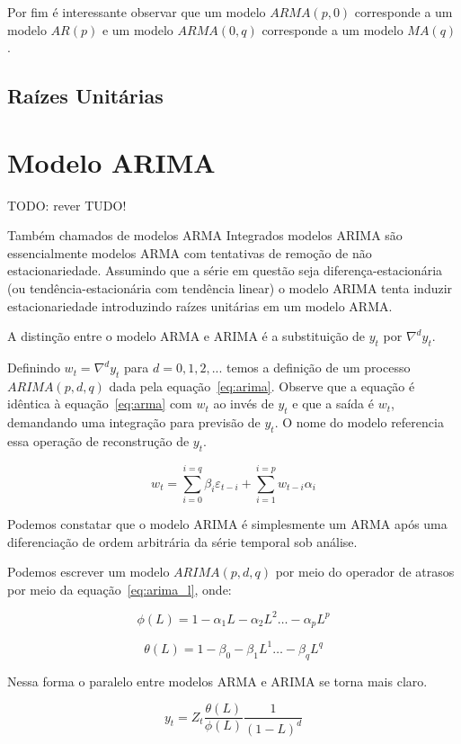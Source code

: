 Por fim é interessante observar que um modelo $ARMA(p, 0)$ corresponde
a um modelo $AR(p)$ e um modelo $ARMA(0, q)$ corresponde a um modelo
$MA(q)$.

\subsection{Raízes Unitárias}
\label{sec:unit_roots}

\section{Modelo ARIMA}
\label{sec:ARIMA}

TODO: rever TUDO!

Também chamados de modelos ARMA Integrados modelos ARIMA são essencialmente
modelos ARMA com tentativas de remoção de não estacionariedade. Assumindo que
a série em questão seja diferença-estacionária (ou tendência-estacionária
com tendência linear) o modelo ARIMA tenta induzir estacionariedade
introduzindo raízes unitárias em um modelo ARMA.

A distinção entre o modelo ARMA e ARIMA é a substituição de $y_t$ por $\nabla^d
y_t$.

Definindo $w_t = \nabla^d y_t$ para $d = 0, 1, 2, ...$ temos a definição de um
processo $ARIMA(p, d, q)$ dada pela equação~\ref{eq:arima}. Observe que a
equação é idêntica à equação~\ref{eq:arma} com $w_t$ ao invés de $y_t$ e que a
saída é $w_t$, demandando uma integração para previsão de $y_t$. O nome do
modelo referencia essa operação de reconstrução de $y_t$.

\begin{equation}\label{eq:arima}
    w_t = \sum_{i=0}^{i=q} \beta_i \varepsilon_{t-i} + \sum_{i=1}^{i=p} w_{t-i}\alpha_i
\end{equation}

Podemos constatar que o modelo ARIMA é simplesmente um ARMA após uma
diferenciação de ordem arbitrária da série temporal sob análise.

Podemos escrever um modelo $ARIMA(p, d, q)$ por meio do operador de atrasos
por meio da equação~\ref{eq:arima_l}, onde:

$$\phi(L) = 1 - \alpha_1 L - \alpha_2 L^2 \hdots - \alpha_p L^p$$

$$\theta(L) = 1 - \beta_0 - \beta_1 L^1 \hdots - \beta_q L^q$$

Nessa forma o paralelo entre modelos ARMA e ARIMA se torna mais claro.

\begin{equation}\label{eq:arima_l}
    y_t = Z_t \frac{\theta(L)}{\phi(L)} \frac{1}{(1-L)^d}
\end{equation}

